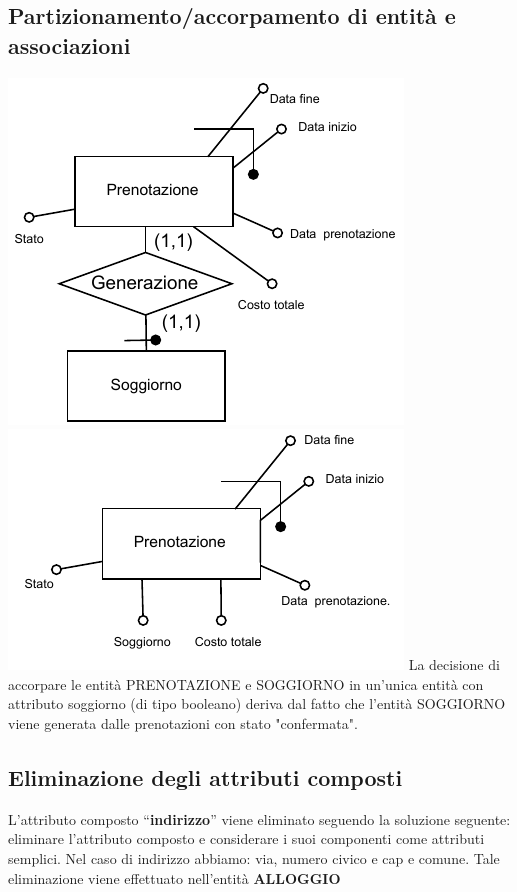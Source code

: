\subsection{Partizionamento/accorpamento di entità e associazioni}
\includegraphics[width=\textwidth]{resources/page13}
\includegraphics[width=\textwidth]{resources/page14}
La decisione di accorpare le entità PRENOTAZIONE e SOGGIORNO in un'unica entità con attributo soggiorno (di tipo booleano) deriva dal fatto che l'entità SOGGIORNO viene generata dalle prenotazioni con stato "confermata".

\subsection{Eliminazione degli attributi composti}
L’attributo composto “\textbf{indirizzo}” viene eliminato seguendo la soluzione seguente: eliminare l’attributo composto e considerare i suoi componenti come attributi semplici. Nel caso di indirizzo abbiamo: via, numero civico e cap e comune.
Tale eliminazione viene effettuato nell'entità \textbf{ALLOGGIO}